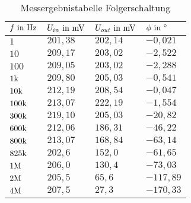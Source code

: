 \begin{table}[H]
\centering
\caption{Messergebnistabelle Folgerschaltung}
\label{tab:folger_erg_tab}
\begin{tabular}{|l|l|l|l|}
\hline
\rowcolor[HTML]{C0C0C0} 
$f\text{ in }\text{Hz}$       & $U_{in}\text{ in }\text{mV}$    & $U_{out}\text{ in }\text{mV}$   & $\phi\text{ in }^\circ$        \\ \hline
$1$    & $201,38$ & $202,14$ & $-0,021$  \\ \hline
$10$   & $209,17$ & $203,02$ & $-2,522$  \\ \hline
$100$  & $209,05$ & $203,02$ & $-2,288$  \\ \hline
$1\text{k}$   & $209,80$ & $205,03$ & $-0,541$  \\ \hline
$10\text{k}$   & $212,19$ & $208,54$ & $-0,047$  \\ \hline
$100\text{k}$ & $213,07$ & $222,19$ & $-1,554$  \\ \hline
$300\text{k}$ & $219,10$ & $205,03$ & $-20,82$  \\ \hline
$600\text{k}$ & $212,06$ & $186,31$ & $-46,22$  \\ \hline
$800\text{k}$ & $213,07$ & $168,84$ & $-63,14$  \\ \hline
$825\text{k}$ & $202,6$  & $152,0$  & $-61,65$  \\ \hline
$1\text{M}$   & $206,0$  & $130,4$  & $-73,03$  \\ \hline
$2\text{M}$   & $205,5$  & $65,6$   & $-117,89$ \\ \hline
$4\text{M}$   & $207,5$  & $27,3$   & $-170,33$ \\ \hline
\end{tabular}
\end{table}